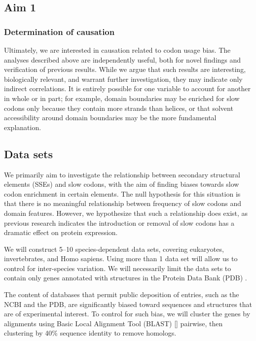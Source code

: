 \documentclass[11pt]{nih}
\begin{document}

\subsection{Aim 1}

\subsubsection{Determination of causation}
Ultimately, we are interested in causation related to codon usage bias. The analyses described above are independently useful, both for novel findings and verification of previous results. While we argue that such results are interesting, biologically relevant, and warrant further investigation, they may indicate only indirect correlations. It is entirely possible for one variable to account for another in whole or in part; for example, domain boundaries may be enriched for slow codons only because they contain more strands than helices, or that solvent accessibility around domain boundaries may be the more fundamental explanation.


\subsection{Data sets}

We primarily aim to investigate the relationship between secondary structural elements (SSEs) and slow codons, with the aim of finding biases towards slow codon enrichment in certain elements. The null hypothesis for this situation is that there is no meaningful relationship between frequency of slow codons and domain features. However, we hypothesize that such a relationship does exist, as previous research indicates the introduction or removal of slow codons has a dramatic effect on protein expression.

We will construct 5--10 species-dependent data sets, covering eukaryotes, invertebrates, and Homo sapiens. Using more than 1 data set will allow us to control for inter-species variation. We will necessarily limit the data sets to contain only genes annotated with structures in the Protein Data Bank (PDB) \citep{pdb}.

The content of databases that permit public deposition of entries, such as the NCBI and the PDB, are significantly biased toward sequences and structures that are of experimental interest. To control for such bias, we will cluster the genes by alignments using Basic Local Alignment Tool (BLAST) [] pairwise, then clustering by 40\% sequence identity to remove homologs.
\end{document}
